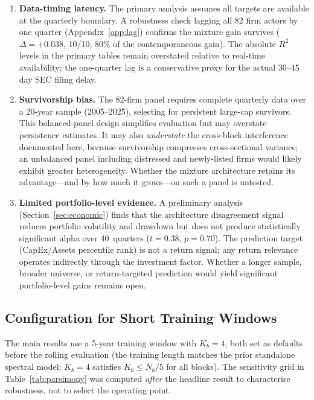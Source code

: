 \documentclass[11pt,a4paper]{article}
\begin{document}
\begin{enumerate}[nosep]
  \item \textbf{Data-timing latency.} The primary analysis assumes all targets are available at the quarterly boundary. A robustness check lagging all 82 firm actors by one quarter (Appendix~\ref{app:lag}) confirms the mixture gain survives ($\Delta = +0.038$, 10/10, 80\% of the contemporaneous gain). The absolute $R^2$ levels in the primary tables remain overstated relative to real-time availability; the one-quarter lag is a conservative proxy for the actual 30--45 day SEC filing delay.
  \item \textbf{Survivorship bias.} The 82-firm panel requires complete quarterly data over a 20-year sample (2005--2025), selecting for persistent large-cap survivors. This balanced-panel design simplifies evaluation but may overstate persistence estimates. It may also \emph{understate} the cross-block interference documented here, because survivorship compresses cross-sectional variance; an unbalanced panel including distressed and newly-listed firms would likely exhibit greater heterogeneity. Whether the mixture architecture retains its advantage---and by how much it grows---on such a panel is untested.
  \item \textbf{Limited portfolio-level evidence.} A preliminary analysis (Section~\ref{sec:economic}) finds that the architecture disagreement signal reduces portfolio volatility and drawdown but does not produce statistically significant alpha over 40~quarters ($t = 0.38$, $p = 0.70$). The prediction target (CapEx/Assets percentile rank) is not a return signal; any return relevance operates indirectly through the investment factor. Whether a longer sample, broader universe, or return-targeted prediction would yield significant portfolio-level gains remains open.
\end{enumerate}

\subsection{Configuration for Short Training Windows}
\label{sec:parsimony}

The main results use a 5-year training window with $K_b{=}4$, both set as defaults before the rolling evaluation (the training length matches the prior standalone spectral model; $K_b{=}4$ satisfies $K_b \leq N_b/5$ for all blocks). The sensitivity grid in Table~\ref{tab:parsimony} was computed \emph{after} the headline result to characterise robustness, not to select the operating point.
\end{document}
